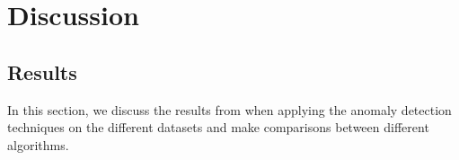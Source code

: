 
\chapter{Discussion}
\label{cha:discussion}


\section{Results}
\label{sec:discussion-results}
In this section, we discuss the results from when applying the anomaly detection techniques on the different datasets and make comparisons between different algorithms.

